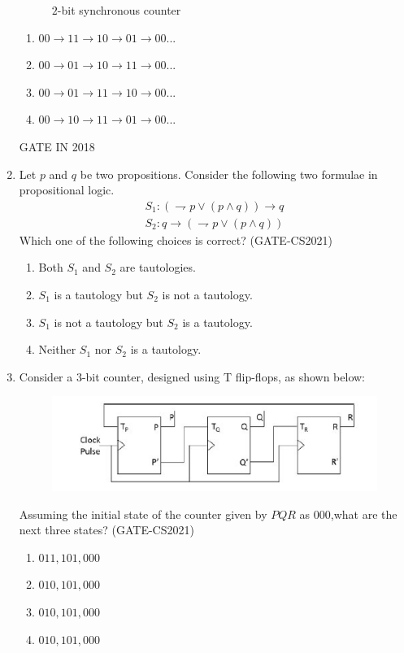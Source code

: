 \begin{enumerate}
\begin{figure}[!ht]
	\caption{$2$-bit synchronous counter}
	\label{fig:enter-label}
\end{figure}
\begin{enumerate}
	\item $00\rightarrow11\rightarrow10\rightarrow01\rightarrow00...$ 
        \item $00\rightarrow01\rightarrow10\rightarrow11\rightarrow00...$
        \item $00\rightarrow01\rightarrow11\rightarrow10\rightarrow00...$
        \item $00\rightarrow10\rightarrow11\rightarrow01\rightarrow00...$
\end{enumerate}
\hfill{GATE IN 2018}
        \item Let $p$ and $q$ be two propositions. Consider the following two formulae in propositional logic.
			\begin{align}
				 S_1 : ( \rightharpoondown p \vee (p \wedge q))\rightarrow q \\
				 S_2 : q\rightarrow(\rightharpoondown p \vee (p \wedge q))
			\end{align}
        Which one of the following choices is correct?
		                                          \hfill(GATE-CS2021)
		\begin{enumerate}[label=(\Alph*)]
			\item Both $S_1$ and $S_2$ are tautologies.
			\item $S_1$ is a tautology but $S_2$ is not a tautology.
			\item $S_1$ is not a tautology but $S_2$ is a tautology.
			\item Neither $S_1$ nor $S_2$ is a tautology.
		\end{enumerate}
\item Consider a $3$-bit counter, designed using T flip-flops, as shown below:
     \begin{figure}[H]
\centering
\includegraphics[width=\columnwidth]{ide/fsm/figs/3bitcounter.jpg}
\caption{}
\label{fig:3bitcounter.jpg}
\end{figure}
Assuming the initial state of the counter given by $PQR$ as $000$,what are the next three states?
                 \hfill(GATE-CS2021)
\begin{enumerate}[label=(\Alph*)]
\item $011, 101, 000$
\item $010, 101, 000$
\item $010, 101, 000$
\item $010, 101, 000$
\end{enumerate}


\end{enumerate}
